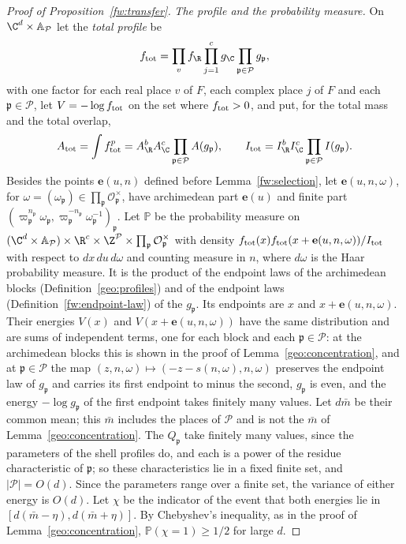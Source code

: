 \begin{proof}[Proof of Proposition~\ref{fw:transfer}]
\emph{The profile and the probability measure.} On $\C^d\times\mathbb
A_{\mathcal P}$ let the \emph{total profile} be
\[
 f_{\rm tot}=\prod_vf_\R\prod_{j=1}^cg_\C\prod_{\mathfrak p\in\mathcal
 P}g_{\mathfrak p},
\]
with one factor for each real place $v$ of $F$, each
complex place $j$ of $F$ and each $\mathfrak p\in\mathcal P$, let
$V=-\log f_{\rm tot}$ on the set where $f_{\rm tot}>0$, and put, for the
total mass and the total overlap,
\[
 A_{\rm tot}=\int f_{\rm tot}^p=A_\R^bA_\C^c\prod_{\mathfrak p\in\mathcal P}A(g_{\mathfrak p}),\qquad
 I_{\rm tot}=I_\R^bI_\C^c\prod_{\mathfrak p\in\mathcal P}I(g_{\mathfrak p}).
\]
Besides the points $\mathbf e(u,n)$ defined before Lemma~\ref{fw:selection},
let $\mathbf e(u,n,\omega)$, for $\omega=(\omega_{\mathfrak
p})\in\prod_{\mathfrak p}\mathcal O_{\mathfrak p}^\times$, have
archimedean part $\mathbf e(u)$ and finite part $(\varpi_{\mathfrak
p}^{n_{\mathfrak p}}\omega_{\mathfrak p},\varpi_{\mathfrak
p}^{-n_{\mathfrak p}}\omega_{\mathfrak p}^{-1})_{\mathfrak p}$. Let
$\mathbb P$ be the probability measure on $(\C^d\times\mathbb
A_{\mathcal P})\times\R^c\times\Z^{\mathcal P}\times\prod_{\mathfrak
p}\mathcal O_{\mathfrak p}^\times$ with density
$f_{\rm tot}(x)f_{\rm tot}(x+\mathbf e(u,n,\omega))/I_{\rm tot}$ with respect to $dx\,du\,d\omega$ and
counting measure in $n$, where $d\omega$ is the Haar probability
measure. It is the product of the endpoint laws of the archimedean
blocks (Definition~\ref{geo:profiles}) and of the endpoint laws
(Definition~\ref{fw:endpoint-law}) of the
$g_{\mathfrak p}$. Its endpoints are $x$ and $x+\mathbf e(u,n,\omega)$. Their
energies $V(x)$ and $V(x+\mathbf e(u,n,\omega))$ have the same distribution
and are sums of independent terms, one for each block and each
$\mathfrak p\in\mathcal P$: at the archimedean blocks this is shown in
the proof of Lemma~\ref{geo:concentration}, and at $\mathfrak
p\in\mathcal P$ the map $(z,n,\omega)\mapsto(-z-s(n,\omega),n,\omega)$
preserves the endpoint law of $g_{\mathfrak p}$ and carries its first
endpoint to minus the second, $g_{\mathfrak p}$ is even, and the energy
$-\log g_{\mathfrak p}$ of the first endpoint takes finitely many values.
Let $d\bar m$ be their common mean; this $\bar m$ includes the places of
$\mathcal P$ and is not the $\bar m$ of Lemma~\ref{geo:concentration}.
The $Q_{\mathfrak p}$ take finitely many values, since the parameters of
the shell profiles do, and each is a power of the residue characteristic
of $\mathfrak p$; so these characteristics lie in a fixed finite set,
and $|\mathcal P|=O(d)$. Since the parameters range over a finite set,
the variance of either energy is $O(d)$. Let $\chi$ be the indicator of
the event that both energies lie in $[d(\bar m-\eta),d(\bar m+\eta)]$.
By Chebyshev's inequality, as in the proof of
Lemma~\ref{geo:concentration}, $\mathbb P(\chi=1)\ge1/2$ for large $d$.


\end{proof}
